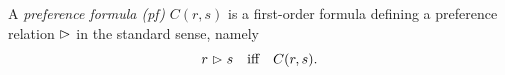 %
%


\begin{definition}
A \emph{preference formula (pf)} $C(r,s)$ is a first-order formula
defining a preference relation $\vartriangleright$ in the standard sense, namely
\[
r \vartriangleright s \quad \textnormal{iff} \quad C(r,s).
\]
\end{definition}

